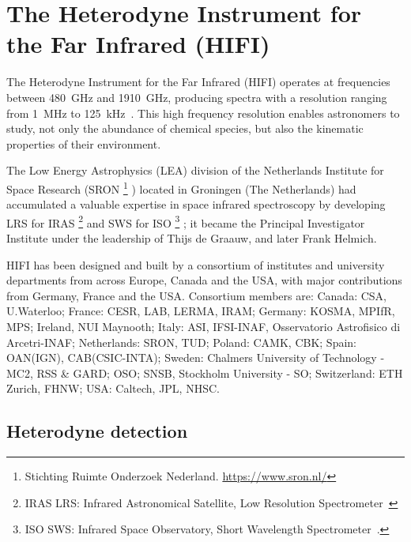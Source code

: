\FloatBarrier
\section{The Heterodyne Instrument for the Far Infrared (HIFI)}
\label{sec:hifi}

The Heterodyne Instrument for the Far Infrared (HIFI) operates at frequencies between \SI{480}{\giga\hertz} and \SI{1910}{\giga\hertz},
producing spectra with a resolution ranging from \SI{1}{\mega\hertz} to \SI{125}{\kilo\hertz}~\autocite{AA_518_L6}.
This high frequency resolution enables astronomers to study, not only the abundance of chemical species, but also the kinematic properties of their environment.

The Low Energy Astrophysics (LEA) division of the Netherlands Institute for Space Research (SRON%
\footnote{
    Stichting Ruimte Onderzoek Nederland.
    \url{https://www.sron.nl/}
}%
) located in Groningen (The Netherlands)
had accumulated a valuable expertise in space infrared spectroscopy by developing
LRS for IRAS%
\footnote{
    IRAS LRS: Infrared Astronomical Satellite, Low Resolution Spectrometer~\autocite{neugebauer1984infrared}
}
and SWS for ISO%
\footnote{
   ISO SWS: Infrared Space Observatory, Short Wavelength Spectrometer~\autocite{isoHandbook5}.
}%
;
it became the Principal Investigator Institute under the leadership of Thijs de Graauw, and later Frank Helmich.

HIFI has been designed and built by a consortium of institutes and university departments from across Europe, Canada and the USA, with major contributions from Germany, France and the USA. Consortium members are: Canada: CSA, U.Waterloo; France: CESR, LAB, LERMA, IRAM; Germany: KOSMA, MPIfR, MPS; Ireland, NUI Maynooth; Italy: ASI, IFSI-INAF, Osservatorio Astrofisico di Arcetri-INAF; Netherlands: SRON, TUD; Poland: CAMK, CBK; Spain: OAN(IGN), CAB(CSIC-INTA); Sweden: Chalmers University of Technology - MC2, RSS \& GARD; OSO; SNSB, Stockholm University - SO; Switzerland: ETH Zurich, FHNW; USA: Caltech, JPL, NHSC.



\subsection{Heterodyne detection}


